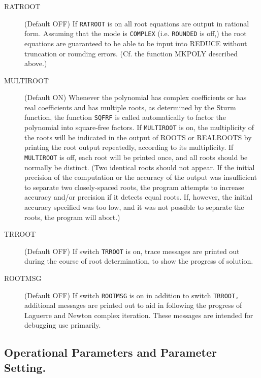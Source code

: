 \begin{description}
\item[RATROOT] (Default OFF) If {\tt RATROOT} is on all root equations are
output in rational form.  Assuming that the mode is {\tt COMPLEX} (i.e.
{\tt ROUNDED} is off,) the root equations are
guaranteed to be able to be input into REDUCE without truncation or
rounding errors. (Cf. the function MKPOLY described above.)

\item[MULTIROOT] (Default ON) Whenever the polynomial has complex
coefficients or has real coefficients and has multiple roots, as
 determined by the Sturm function, the function {\tt SQFRF}
is called automatically to factor the polynomial into square-free factors.
If {\tt MULTIROOT} is on, the multiplicity of the roots will be indicated
in the output of ROOTS or REALROOTS by printing the root output
repeatedly, according to its multiplicity.  If {\tt MULTIROOT} is off,
each root will be printed once, and all roots should be normally be
distinct. (Two identical roots should not appear.  If the initial
precision of the computation or the accuracy of the output was
insufficient to separate two closely-spaced roots, the program attempts to
increase accuracy and/or precision if it detects equal roots.  If,
however, the initial accuracy specified was too low, and it was not
possible to separate the roots, the program will abort.)

\item[TRROOT] (Default OFF) If switch {\tt TRROOT} is on, trace messages
are printed out during the course of root determination, to show the
progress of solution.

 \item[ROOTMSG] (Default OFF) If switch
{\tt ROOTMSG} is on in addition to switch {\tt TRROOT,} additional
messages are printed out to aid in following the progress of Laguerre and
Newton complex iteration.  These messages are intended for debugging use
primarily.


\end{description}


\subsection{Operational Parameters and Parameter Setting.}

